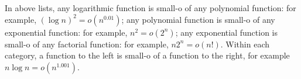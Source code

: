 In above lists, any logarithmic function is small-o of any polynomial function: for example, $(\log n)^2 = o(n^{0.01})$;
any polynomial function is small-o of any exponential function: for example, $n^2 = o(2^n)$;
any exponential function is small-o of any factorial function: for example, $n2^n = o(n!)$.
Within each category, a function to the left is small-o of a function to the right, for example $n\log n = o(n^{1.001})$.

